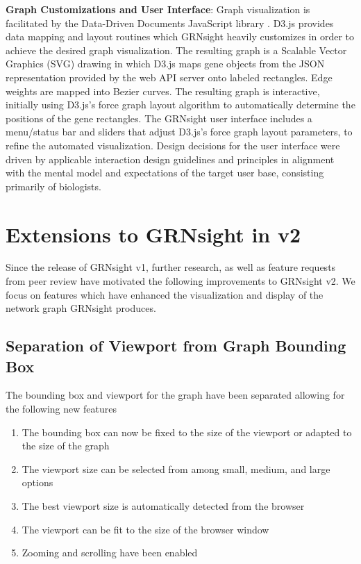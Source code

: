 \documentclass[sigconf,review,anonymous]{acmart}
\begin{document}
\textbf{Graph Customizations and User Interface}: Graph visualization is facilitated by the Data-Driven Documents JavaScript library \cite{d3}. D3.js provides data mapping and layout routines which GRNsight heavily customizes in order to achieve the desired graph visualization. The resulting graph is a Scalable Vector Graphics (SVG) drawing in which D3.js maps gene objects from the JSON representation provided by the web API server onto labeled rectangles. Edge weights are mapped into Bezier curves. The resulting graph is interactive, initially using D3.js's force graph layout algorithm to automatically determine the positions of the gene rectangles. The GRNsight user interface includes a menu/status bar and sliders that adjust D3.js's force graph layout parameters, to refine the automated visualization. Design decisions for the user interface were driven by applicable interaction design guidelines and principles \cite{norman2013design,shneiderman2010designing,nielsen1994usability} in alignment with the mental model and expectations of the target user base, consisting primarily of biologists.

\section{Extensions to GRNsight in v2}
Since the release of GRNsight v1, further research, as well as feature requests from peer review have motivated the following improvements to GRNsight v2. We focus on features which have enhanced the visualization and display of the network graph GRNsight produces.

\subsection{Separation of Viewport from Graph Bounding Box}

The bounding box and viewport for the graph have been separated allowing for the following new features
\begin{enumerate}
  \item The bounding box can now be fixed to the size of the viewport or adapted to the size of the graph
  \item The viewport size can be selected from among small, medium, and large options
  \item The best viewport size is automatically detected from the browser
  \item The viewport can be fit to the size of the browser window 
  \item Zooming and scrolling have been enabled
\end{enumerate}
\end{document}
